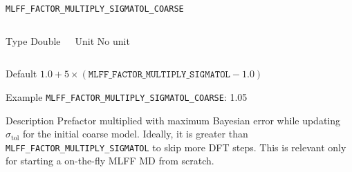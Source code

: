 \begin{frame}[allowframebreaks]{\texttt{{MLFF\_FACTOR\_MULTIPLY\_SIGMATOL\_COARSE}}} \label{MLFF_FACTOR_MULTIPLY_SIGMATOL_COARSE}
\vspace*{-12pt}
\begin{columns}
\begin{block}{Type}
Double
\end{block}

\begin{block}{Unit}
No unit
\end{block}

\end{columns}

\begin{block}{Default}
$1.0 + 5\times(\texttt{{MLFF\_FACTOR\_MULTIPLY\_SIGMATOL}} - 1.0)$
\end{block}

\begin{block}{Example}
\texttt{MLFF\_FACTOR\_MULTIPLY\_SIGMATOL\_COARSE}: 1.05
\end{block}

\begin{block}{Description}
Prefactor multiplied with maximum Bayesian error while updating $\sigma_{\text{tol}}$ for the initial coarse model. Ideally, it is greater than \texttt{MLFF\_FACTOR\_MULTIPLY\_SIGMATOL} to skip more DFT steps. This is relevant only for starting a on-the-fly MLFF MD from scratch.
\end{block}

\end{frame}

